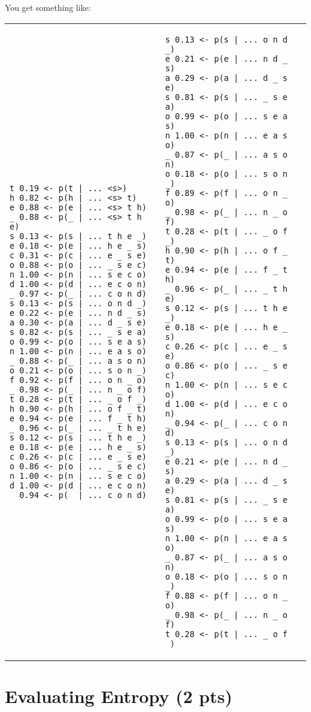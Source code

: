 \documentclass{article}
\begin{document}
You get something like:

\begin{tabular}{p{7cm} | p{7cm}}
\begin{verbatim}
t 0.19 <- p(t | ... <s>)
h 0.82 <- p(h | ... <s> t)
e 0.88 <- p(e | ... <s> t h)
_ 0.88 <- p(_ | ... <s> t h e)
s 0.13 <- p(s | ... t h e _)
e 0.18 <- p(e | ... h e _ s)
c 0.31 <- p(c | ... e _ s e)
o 0.88 <- p(o | ... _ s e c)
n 1.00 <- p(n | ... s e c o)
d 1.00 <- p(d | ... e c o n)
_ 0.97 <- p(_ | ... c o n d)
s 0.13 <- p(s | ... o n d _)
e 0.22 <- p(e | ... n d _ s)
a 0.30 <- p(a | ... d _ s e)
s 0.82 <- p(s | ... _ s e a)
o 0.99 <- p(o | ... s e a s)
n 1.00 <- p(n | ... e a s o)
_ 0.88 <- p(_ | ... a s o n)
o 0.21 <- p(o | ... s o n _)
f 0.92 <- p(f | ... o n _ o)
_ 0.98 <- p(_ | ... n _ o f)
t 0.28 <- p(t | ... _ o f _)
h 0.90 <- p(h | ... o f _ t)
e 0.94 <- p(e | ... f _ t h)
_ 0.96 <- p(_ | ... _ t h e)
s 0.12 <- p(s | ... t h e _)
e 0.18 <- p(e | ... h e _ s)
c 0.26 <- p(c | ... e _ s e)
o 0.86 <- p(o | ... _ s e c)
n 1.00 <- p(n | ... s e c o)
d 1.00 <- p(d | ... e c o n)
_ 0.94 <- p(_ | ... c o n d)
\end{verbatim}
&
\begin{verbatim}
s 0.13 <- p(s | ... o n d _)
e 0.21 <- p(e | ... n d _ s)
a 0.29 <- p(a | ... d _ s e)
s 0.81 <- p(s | ... _ s e a)
o 0.99 <- p(o | ... s e a s)
n 1.00 <- p(n | ... e a s o)
_ 0.87 <- p(_ | ... a s o n)
o 0.18 <- p(o | ... s o n _)
f 0.89 <- p(f | ... o n _ o)
_ 0.98 <- p(_ | ... n _ o f)
t 0.28 <- p(t | ... _ o f _)
h 0.90 <- p(h | ... o f _ t)
e 0.94 <- p(e | ... f _ t h)
_ 0.96 <- p(_ | ... _ t h e)
s 0.12 <- p(s | ... t h e _)
e 0.18 <- p(e | ... h e _ s)
c 0.26 <- p(c | ... e _ s e)
o 0.86 <- p(o | ... _ s e c)
n 1.00 <- p(n | ... s e c o)
d 1.00 <- p(d | ... e c o n)
_ 0.94 <- p(_ | ... c o n d)
s 0.13 <- p(s | ... o n d _)
e 0.21 <- p(e | ... n d _ s)
a 0.29 <- p(a | ... d _ s e)
s 0.81 <- p(s | ... _ s e a)
o 0.99 <- p(o | ... s e a s)
n 1.00 <- p(n | ... e a s o)
_ 0.87 <- p(_ | ... a s o n)
o 0.18 <- p(o | ... s o n _)
f 0.88 <- p(f | ... o n _ o)
_ 0.98 <- p(_ | ... n _ o f)
t 0.28 <- p(t | ... _ o f _)
\end{verbatim}
\end{tabular}

\section{Evaluating Entropy (2 pts)}
\end{document}

